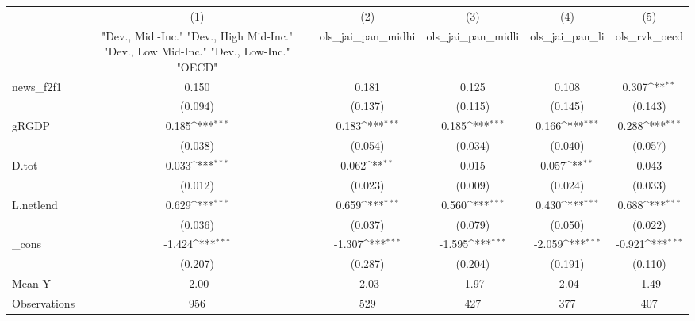 {
\def\sym#1{\ifmmode^{#1}\else\(^{#1}\)\fi}
\begin{tabular}{l*{5}{c}}
\toprule
            &\multicolumn{1}{c}{(1)}&\multicolumn{1}{c}{(2)}&\multicolumn{1}{c}{(3)}&\multicolumn{1}{c}{(4)}&\multicolumn{1}{c}{(5)}\\
            &\multicolumn{1}{c}{ "Dev., Mid.-Inc." "Dev., High Mid-Inc." "Dev., Low Mid-Inc." "Dev., Low-Inc." "OECD" }&\multicolumn{1}{c}{ols\_jai\_pan\_midhi}&\multicolumn{1}{c}{ols\_jai\_pan\_midli}&\multicolumn{1}{c}{ols\_jai\_pan\_li}&\multicolumn{1}{c}{ols\_rvk\_oecd}\\
\midrule
news\_f2f1   &       0.150         &       0.181         &       0.125         &       0.108         &       0.307\sym{**} \\
            &     (0.094)         &     (0.137)         &     (0.115)         &     (0.145)         &     (0.143)         \\
\addlinespace
gRGDP       &       0.185\sym{***}&       0.183\sym{***}&       0.185\sym{***}&       0.166\sym{***}&       0.288\sym{***}\\
            &     (0.038)         &     (0.054)         &     (0.034)         &     (0.040)         &     (0.057)         \\
\addlinespace
D.tot       &       0.033\sym{***}&       0.062\sym{**} &       0.015         &       0.057\sym{**} &       0.043         \\
            &     (0.012)         &     (0.023)         &     (0.009)         &     (0.024)         &     (0.033)         \\
\addlinespace
L.netlend   &       0.629\sym{***}&       0.659\sym{***}&       0.560\sym{***}&       0.430\sym{***}&       0.688\sym{***}\\
            &     (0.036)         &     (0.037)         &     (0.079)         &     (0.050)         &     (0.022)         \\
\addlinespace
\_cons      &      -1.424\sym{***}&      -1.307\sym{***}&      -1.595\sym{***}&      -2.059\sym{***}&      -0.921\sym{***}\\
            &     (0.207)         &     (0.287)         &     (0.204)         &     (0.191)         &     (0.110)         \\
\midrule
Mean Y      &       -2.00         &       -2.03         &       -1.97         &       -2.04         &       -1.49         \\
Observations&         956         &         529         &         427         &         377         &         407         \\
\bottomrule
\end{tabular}
}
